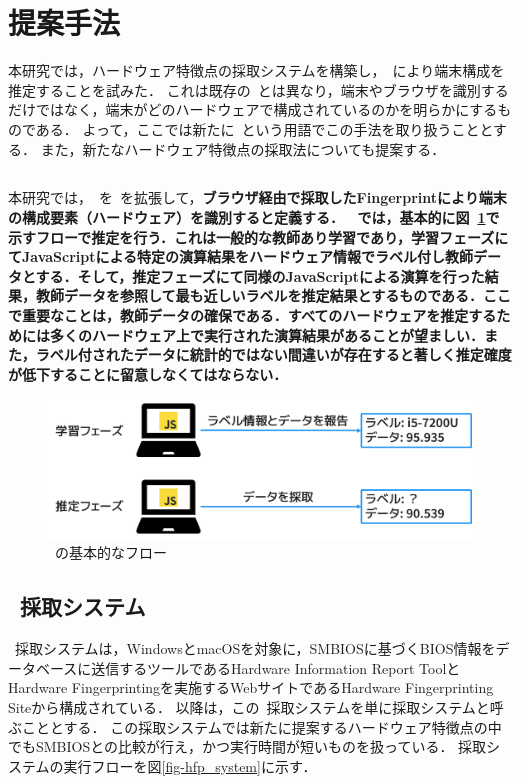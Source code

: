 \newpage
\section{提案手法}
本研究では，ハードウェア特徴点の採取システムを構築し，\fp~により端末構成を推定することを試みた．
これは既存の\fp~とは異なり，端末やブラウザを識別するだけではなく，端末がどのハードウェアで構成されているのかを明らかにするものである．
よって，ここでは新たに\hfp~という用語でこの手法を取り扱うこととする．
また，新たなハードウェア特徴点の採取法についても提案する．

\subsection{\hfp}
本研究では，\hfp~を\fp~を拡張して，\bf{ブラウザ経由で採取したFingerprintにより端末の構成要素（ハードウェア）を識別する}と定義する．
\hfp~では，基本的に図~\ref{fig-hfp}で示すフローで推定を行う．これは一般的な教師あり学習であり，学習フェーズにてJavaScriptによる特定の演算結果をハードウェア情報でラベル付し教師データとする．そして，推定フェーズにて同様のJavaScriptによる演算を行った結果，教師データを参照して最も近しいラベルを推定結果とするものである．ここで重要なことは，教師データの確保である．すべてのハードウェアを推定するためには多くのハードウェア上で実行された演算結果があることが望ましい．また，ラベル付されたデータに統計的ではない間違いが存在すると著しく推定確度が低下することに留意しなくてはならない．
\begin{figure}[H]
	\centering
    \includegraphics[width=\textwidth,pagebox=artbox]{fig/hfp.png}
    \caption{\hfp~の基本的なフロー}
    \label{fig-hfp}
\end{figure}

\subsection{\hfp~採取システム}
\hfp~採取システムは，WindowsとmacOSを対象に，SMBIOSに基づくBIOS情報をデータベースに送信するツールであるHardware Information Report ToolとHardware Fingerprintingを実施するWebサイトであるHardware Fingerprinting Siteから構成されている．
以降は，この\hfp~採取システムを単に採取システムと呼ぶこととする．
この採取システムでは新たに提案するハードウェア特徴点の中でもSMBIOSとの比較が行え，かつ実行時間が短いものを扱っている．
採取システムの実行フローを図\ref{fig-hfp_system}に示す．

